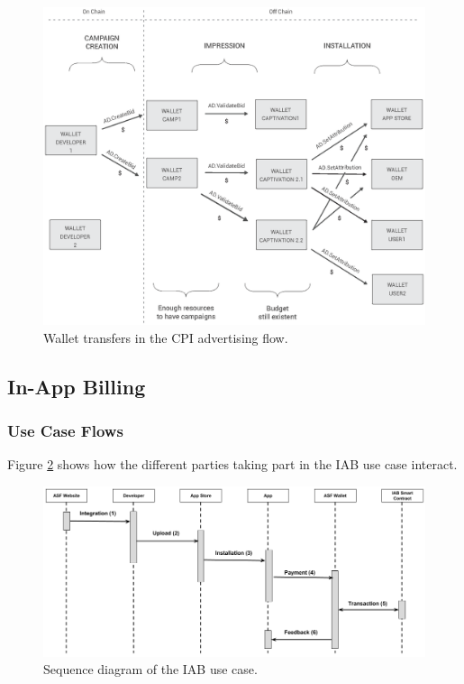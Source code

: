 \begin{figure}[!ht]
\centering
\includegraphics[width=\textwidth]{diagrams/wallet_transfers.eps}
\caption{Wallet transfers in the CPI advertising flow.}
\label{fig:wallet_cpi_flow}
\end{figure}


\subsection{In-App Billing}

\subsubsection{Use Case Flows}

Figure \ref{fig:iab_sequence_diagram} shows how the different parties taking part in the IAB use case interact.

\begin{figure}[!ht]
\centering
\includegraphics[width=\textwidth]{diagrams/iab_sequence_diagram.png}
\caption{Sequence diagram of the IAB use case.}
\label{fig:iab_sequence_diagram}
\end{figure}

